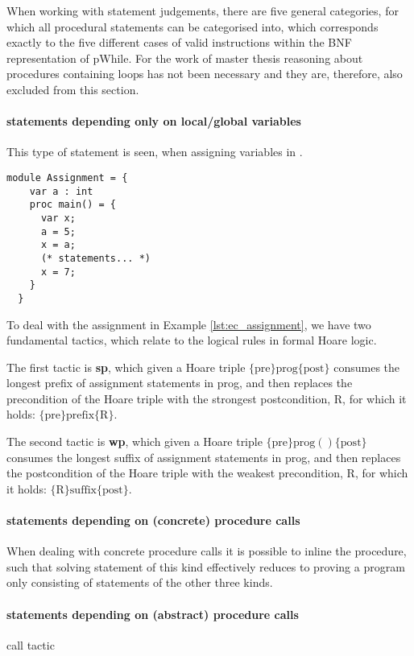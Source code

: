 When working with statement judgements, there are five general categories, for
which all procedural statements can be categorised into, which corresponds
exactly to the five different cases of valid instructions within the BNF
representation of pWhile. For the work of master thesis reasoning about
procedures containing loops has not been necessary and they are, therefore,
also excluded from this section.


\paragraph{statements depending only on local/global variables}
This type of statement is seen, when assigning variables in \easycrypt.

\begin{lstlisting}[float,label=lst:ec_assignment,caption=Example: assigning
  values in \easycrypt]
  module Assignment = {
    var a : int
    proc main() = {
      var x;
      a = 5;
      x = a;
      (* statements... *)
      x = 7;
    }
  }
\end{lstlisting}

To deal with the assignment in Example \ref{lst:ec_assignment}, we have two
fundamental tactics, which relate to the logical rules in formal Hoare logic.

The first tactic is \textbf{sp}, which given a Hoare triple $\{\text{pre}\} \text{prog} \{\text{post}\}$  consumes the longest prefix of
assignment statements in prog, and then replaces the precondition of the Hoare triple
with the strongest postcondition, R, for which it holds: $\{\text{pre}\} \text{prefix} \{\text{R}\}$.

The second tactic is \textbf{wp}, which given a Hoare triple $\{\text{pre}\}
\text{prog}() \{\text{post}\}$  consumes the longest suffix of assignment
statements in prog, and then replaces the postcondition of the Hoare triple with
the weakest precondition, R, for which it holds: $\{\text{R}\} \text{suffix} \{\text{post}\}$.

\paragraph{statements depending on (concrete) procedure calls}
When dealing with concrete procedure calls it is possible to inline the
procedure, such that solving statement of this kind effectively reduces to
proving a program only consisting of statements of the other three kinds.

\paragraph{statements depending on (abstract) procedure calls}
call tactic

